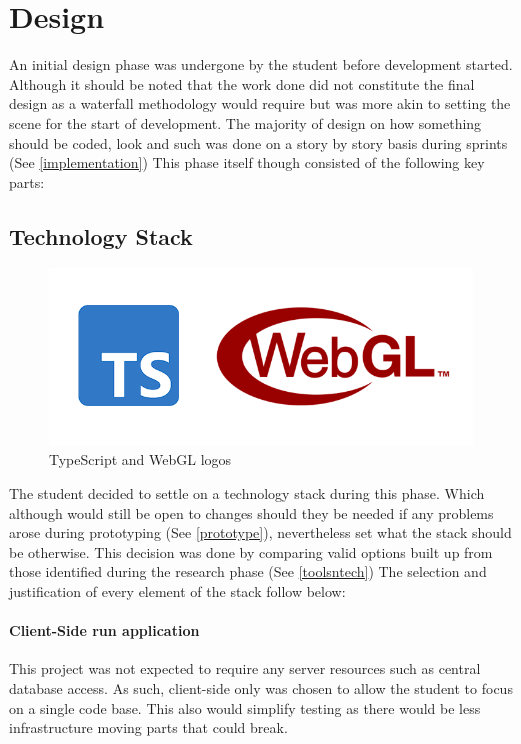 \section{Design}
An initial design phase was undergone by the student before development started. Although it should be noted that the work done did not constitute the final design as a waterfall methodology would require but was more akin to setting the scene for the start of development. The majority of design on how something should be coded, look and such was done on a story by story basis during sprints (See \ref{implementation})
This phase itself though consisted of the following key parts:

\subsection{Technology Stack} \label{techstack}
\begin{figure}[h]
    \centering
    \includegraphics[width=1\columnwidth]{author-files/figures/logo-ts-webgl.PNG}
    \caption{TypeScript \cite[]{microsoft_2020_typescript} and WebGL logos \cite[]{khronosgroup_2017_the}}
    \label{fig:tswebgllogo}
\end{figure}
The student decided to settle on a technology stack during this phase. Which although would still be open to changes should they be needed if any problems arose during prototyping (See \ref{prototype}), nevertheless set what the stack should be otherwise. This decision was done by comparing valid options built up from those identified during the research phase (See \ref{toolsntech}) The selection and justification of every element of the stack follow below:

\paragraph{Client-Side run application}
This project was not expected to require any server resources such as central database access. As such, client-side only was chosen to allow the student to focus on a single code base. This also would simplify testing as there would be less infrastructure moving parts that could break.

